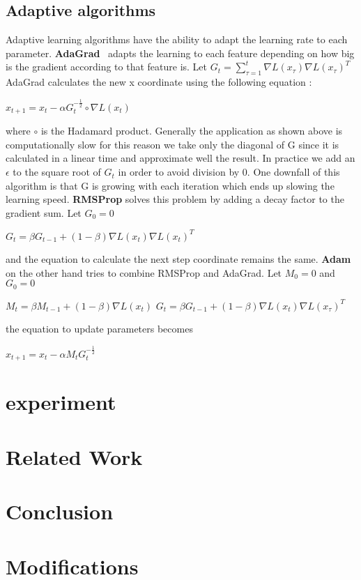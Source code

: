 \documentclass[sigconf]{acmart}
\begin{document}
\subsection{Adaptive algorithms}
Adaptive learning algorithms have the ability to adapt the learning rate to each parameter.
\newline \textbf{AdaGrad}~\cite{AdaGrad} adapts the learning to each feature depending on how big is the gradient according to that feature is. Let $G_t = \sum_{\tau=1}^{t} \nabla L(x_\tau) \nabla L(x_\tau)^T$ AdaGrad calculates the new x coordinate using the following equation :
\begin{center}
    $x_{t+1} = x_t -\alpha G_t^{-\frac{1}{2}}\circ \nabla L(x_t)$
\end{center}
where $\circ$ is the Hadamard product. Generally the application as shown above is computationally slow for this reason we take only the diagonal of G since it is calculated in a linear time and approximate well the result. In practice we add an $\epsilon$ to the square root of $G_t$ in order to avoid division by 0. One downfall of this algorithm is that G is growing with each iteration which ends up slowing the learning speed.
\newline \textbf{RMSProp}\cite{RMSProp} solves this problem by adding a decay factor to the gradient sum. Let $G_0=0$
\begin{center}
    $G_t = \beta G_{t-1} + (1-\beta) \nabla L(x_t) \nabla L(x_t)^T$
\end{center}
and the equation to calculate the next step coordinate remains the same.
\newline  \textbf{Adam}\cite{kingma2014adam} on the other hand tries to combine RMSProp and AdaGrad. Let $M_0 = 0$ and $G_0=0$
\begin{center}
    $M_t = \beta M_{t-1} + (1-\beta) \nabla L(x_t)$
    $G_t = \beta G_{t-1} + (1-\beta) \nabla L(x_t) \nabla L(x_\tau)^T$
\end{center}
the equation to update parameters becomes
\begin{center}
    $x_{t+1} = x_t -\alpha M_t G_t^{-\frac{1}{2}}$ 
\end{center}


\section{experiment}



\section{Related Work}

\section{Conclusion}

\section{Modifications}










\appendix
\end{document}
